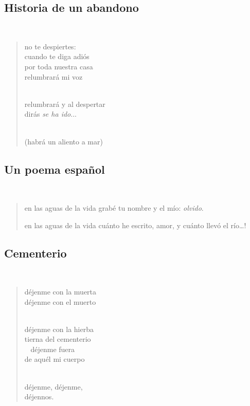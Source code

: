 \documentclass[a4paper, 12pt]{article}
\begin{document}
\pagebreak

\subsection{Historia de un abandono}
~ 

\begin{verse}


no te despiertes:\\
cuando te diga adiós\\
por toda nuestra casa\\
relumbrará mi voz\\
~ 

relumbrará y al despertar\\
dirás \textit{se ha ido}...\\
~ 

(habrá un aliento a mar)

\end{verse}

\pagebreak
\subsection{Un poema español}
~ 

\begin{verse}
    
en las aguas de la vida
grabé tu nombre y el mío:
\textit{olvido}.

en las aguas de la vida
cuánto he escrito, amor,
y cuánto llevó el río…!
\end{verse}

\pagebreak 

\subsection{Cementerio}
~ 

\begin{verse}
    
déjenme con la muerta\\
déjenme con el muerto\\
~ 

déjenme con la hierba\\
tierna del cementerio\\
~ 
déjenme fuera\\
de aquél mi cuerpo\\
~ 

déjenme, déjenme,\\
déjennos.\\
\end{verse}
\end{document}
